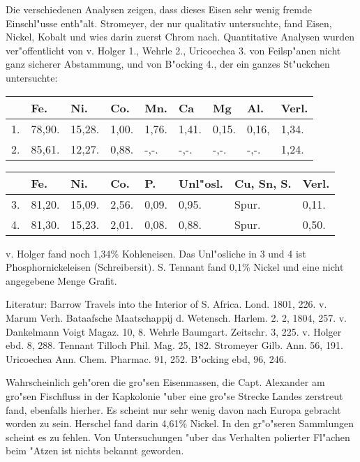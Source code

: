 \documentclass[a4paper, 11pt, oneside]{article}
\begin{document}
Die verschiedenen Analysen zeigen, dass dieses Eisen sehr wenig fremde Einschl"usse enth"alt. Stromeyer, der nur qualitativ untersuchte, fand Eisen, Nickel, Kobalt und wies darin zuerst Chrom nach. Quantitative Analysen wurden ver"offentlicht von v. Holger 1., Wehrle 2., Uricoechea 3. von Feilsp"anen nicht ganz sicherer Abstammung, und von B"ocking 4., der ein ganzes St"uckchen untersuchte:
\begin{table}[H]
    \centering\swabfamily\Large
    \begin{tabular}{l l l l l l l l l}
         & Fe. & Ni. & Co. & Mn. & Ca & Mg & Al. & Verl. \\ \hline
        1. & 78,90. & 15,28. & 1,00. & 1,76. & 1,41. & 0,15. & 0,16, & 1,34. \\
        2. & 85,61. & 12,27. & 0,88. & -,-. & -,-. & -,-. & -,-. & 1,24. \\
    \end{tabular}
\end{table}

\begin{table}[H]
    \centering\swabfamily\Large
    \begin{tabular}{l l l l l l l l}
         & Fe. & Ni. & Co. & P. & Unl"osl. & Cu, Sn, S. & Verl. \\ \hline
        3. & 81,20. & 15,09. & 2,56. & 0,09. & 0,95. & Spur. & 0,11. \\
        4. & 81,30. & 15,23. & 2,01. & 0,08. & 0,88. & Spur. & 0,50. \\
    \end{tabular}
\end{table}

v. Holger fand noch 1,34\% Kohleneisen. Das Unl"osliche in 3 und 4 ist Phosphornickeleisen (Schreibersit). S. Tennant fand 0,1\% Nickel und eine nicht angegebene Menge Grafit.

\normalsize
Literatur: Barrow Travels into the Interior of S. Africa. Lond. 1801, 226. v. Marum Verh. Bataafsche Maatschappij d. Wetensch. Harlem. 2. 2, 1804, 257. v. Dankelmann Voigt Magaz. 10, 8. Wehrle Baumgart. Zeitschr. 3, 225. v. Holger ebd. 8, 288. Tennant Tilloch Phil. Mag. 25, 182. Stromeyer Gilb. Ann. 56, 191. Uricoechea Ann. Chem. Pharmac. 91, 252. B"ocking ebd, 96, 246.

\LARGE
Wahrscheinlich geh"oren die gro"sen Eisenmassen, die Capt. Alexander am gro"sen Fischfluss in der Kapkolonie "uber eine gro"se Strecke Landes zerstreut fand, ebenfalls hierher. Es scheint nur sehr wenig davon nach Europa gebracht worden zu sein. Herschel fand darin 4,61\% Nickel. In den gr"o"seren Sammlungen scheint es zu fehlen. Von Untersuchungen "uber das Verhalten polierter Fl"achen beim "Atzen ist nichts bekannt geworden.
\end{document}

